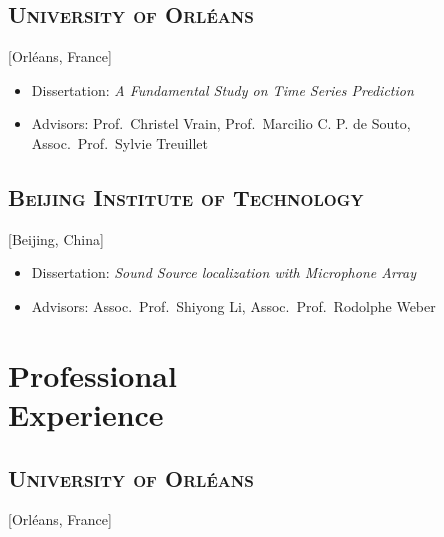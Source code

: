 \documentclass{mycv}
\begin{document}
\subsection{\scshape University of Orl\'eans}[Orl\'eans, France]

\begin{positions}
\end{positions}

\vspace{-\parskip}

\begin{itemize}[label={}]
  \itemsep 0em
  \item Dissertation: \textit{A Fundamental Study on Time Series Prediction}
  \item Advisors: Prof.~Christel Vrain, Prof.~Marcilio C. P. de Souto, Assoc.~Prof.~Sylvie Treuillet
\end{itemize}

\vspace{-\parskip}

\subsection{\scshape Beijing Institute of Technology}[Beijing, China]

\begin{positions}
\end{positions}

\vspace{-\parskip}

\begin{itemize}[label={}]
  \itemsep 0em
  \item Dissertation: \textit{Sound Source localization with Microphone Array}
  \item Advisors: Assoc.~Prof.~Shiyong Li, Assoc.~Prof.~Rodolphe Weber
\end{itemize}

\section{Professional \\ Experience}

\subsection{\scshape University of Orl\'eans}[Orl\'eans, France]
\end{document}
